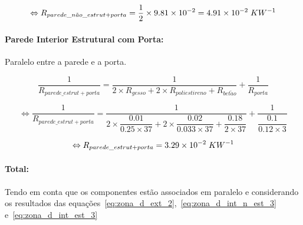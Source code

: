 \documentclass[12pt, a4paper]{article}
\begin{document}
\begin{equation}
    \Leftrightarrow R_{parede\_n\tilde{a}o\_estrut + porta} =
        \dfrac{1}{2} \times 9.81 \times 10^{-2} = 4.91 \times 10^{-2} \hspace{1mm} KW^{-1}
    \label{eq:zona_d_int_n_est_3}
\end{equation}


\paragraph{Parede Interior Estrutural com Porta:}\label{par:zona_d_int_est}Paralelo entre a parede e a porta.

\begin{equation}
    \dfrac{1}{R_{parede\_estrut + porta}} =
        \dfrac{1}{
            2 \times R_{gesso} + 2 \times R_{poliestireno} + R_{bet\tilde{a}o}
        }
        +
        \dfrac{1}{
            R_{porta}
        }
    \label{eq:zona_d_int_est_1}
\end{equation}

\begin{equation}
    \Leftrightarrow \dfrac{1}{R_{parede\_estrut + porta}} =
        \dfrac{1}{
            2 \times \dfrac{0.01}{0.25 \times 37} +
            2 \times \dfrac{0.02}{0.033 \times 37} +
            \dfrac{0.18}{2 \times 37}
        }
        +
        \dfrac{1}{
            \dfrac{0.1}{0.12 \times 3}
        }
    \label{eq:zona_d_int_est_2}
\end{equation}

\begin{equation}
    \Leftrightarrow R_{parede\_estrut + porta} = 3.29 \times 10^{-2} \hspace{1mm} KW^{-1}
    \label{eq:zona_d_int_est_3}
\end{equation}


\paragraph{Total:}\label{par:zona_d_total:} Tendo em conta que os componentes est\~ao
associados em paralelo e considerando os resultados das
equa\c{c}\~oes~\ref{eq:zona_d_ext_2},~\ref{eq:zona_d_int_n_est_3} e~\ref{eq:zona_d_int_est_3}
\end{document}
